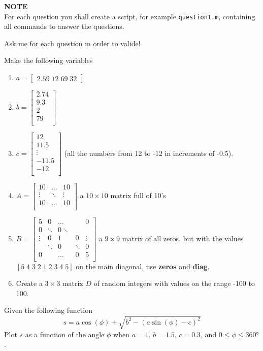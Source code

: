 \documentclass[12pt]{TDTP}
\begin{document}
\titre

\textbf{NOTE}\\
For each question you shall create a script, for example \texttt{question1.m}, containing all commands to answer the questions.

Ask me for each question in order to valide!

\Exo
Make the following variables
\begin{enumerate}
\item $a = \begin{bmatrix} 2.59 \; 12 \; 69 \; 32 \end{bmatrix}$
\item $b = \begin{bmatrix} 2.74 \\ 9.3 \\ 2 \\ 79\\ \end{bmatrix}$
 \item $c = \begin{bmatrix} 12 \\ 11.5 \\ \vdots \\ -11.5\\ -12 \\ \end{bmatrix}$ (all the numbers from 12 to -12 in increments of -0.5).
 \item $A = \begin{bmatrix} 
 10 & \ldots & 10 \\ 
 \vdots & \ddots & \vdots\\ 
 10 & \ldots & 10 \\
 \end{bmatrix}$ a $10\times 10$ matrix full of 10's
\item $B = \begin{bmatrix} 
 5 & 0 & \ldots & & 0 \\ 
 0 & \ddots & 0 \ddots & \\ 
 \vdots & 0 & 1 & 0 & \vdots \\
  & \ddots & 0 & \ddots & 0 \\
  0 &  & \ldots & 0 & 5\\
 \end{bmatrix}$ 
 a $9\times 9$ matrix of all zeros, but with the values $[5 \; 4 \; 3 \;  2 \; 1 \;  2 \;  3 \;  4 \;  5]$ on the main diagonal, use \textbf{zeros} and \textbf{diag}.
 \item Create a $3\times 3$ matrix $D$ of random integers with values on the range -100 to 100.
\end{enumerate}


\Exo
Given the following function
$$
s = a \cos(\phi) + \sqrt{b^2 - (a\sin(\phi)-c)^2}
$$
Plot $s$ as a function of the angle $\phi$ when $a=1$, $b=1.5$, $c=0.3$, and $0\leq \phi \leq 360°$.

\end{document}
